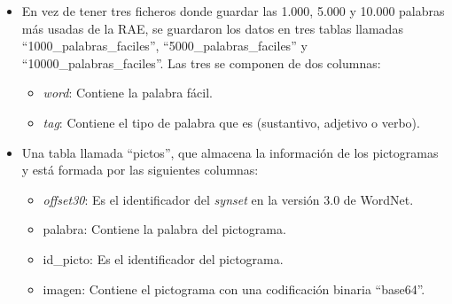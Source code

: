 \begin{itemize}
	\item En vez de tener tres ficheros donde guardar las 1.000, 5.000 y 10.000 palabras más usadas de la RAE, se guardaron los datos en tres tablas llamadas ``1000\_palabras\_faciles'', ``5000\_palabras\_faciles'' y ``10000\_palabras\_faciles''. Las tres se componen de dos columnas:
	\begin{itemize}
		\item \textit{word}: Contiene la palabra fácil.  
		\item \textit{tag}: Contiene el tipo de palabra que es (sustantivo, adjetivo o verbo).
	\end{itemize} 
	 
	 
	\item Una tabla llamada ``pictos'', que almacena la información de los pictogramas y está formada por las siguientes columnas:
	\begin{itemize}
		\item \textit{offset30}: Es el identificador del \textit{synset} en la versión 3.0 de WordNet.
		\item palabra: Contiene la palabra del pictograma.
		\item id\_picto: Es el identificador del pictograma.
		\item imagen: Contiene el pictograma con una codificación binaria ``base64''.
	\end{itemize}

\end{itemize}


